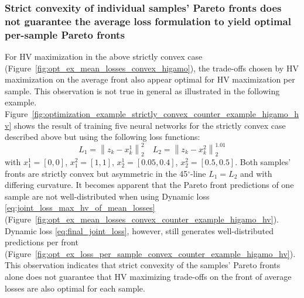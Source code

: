 \subsubsection{Strict convexity of individual samples' Pareto fronts does not guarantee the average loss formulation to yield optimal per-sample Pareto fronts}
\label{sec:counter example strict convexity}
For HV maximization in the above strictly convex case (Figure~\ref{fig:opt_ex_mean_losses_convex_higamo}), the trade-offs chosen by HV maximization on the average front also appear optimal for HV maximization per sample. This observation is not true in general as illustrated in the following example. Figure~\ref{fig:optimization_example_strictly_convex_counter_example_higamo_hv} shows the result of training five neural networks for the strictly convex case described above but using the following loss functions:
\begin{equation*}
    L_{1} = \left\lVert z_{k} - x_{k}^{1} \right\rVert_{2}^{2}  \quad L_{2} = \left\lVert z_{k} - x_{k}^{2}\right\rVert_{2}^{1.01}
\end{equation*}
with $x_{1}^{1} = [0,0]$, $x_{1}^{2} = [1,1]$, $x_{2}^{1} = [0.05,0.4]$, $x_{2}^{2} = [0.5,0.5]$. Both samples' fronts are strictly convex but asymmetric in the 45$^{\circ}$-line $L_{1}=L_{2}$ and with differing curvature.
It becomes apparent that the Pareto front predictions of one sample are not well-distributed when using Dynamic loss \eqref{eq:joint_loss_max_hv_of_mean_losses} (Figure~\ref{fig:opt_ex_mean_losses_convex_counter_example_higamo_hv}). Dynamic loss \eqref{eq:final_joint_loss}, however, still generates well-distributed predictions per front (Figure~\ref{fig:opt_ex_loss_per_sample_convex_counter_example_higamo_hv}). This observation indicates that strict convexity of the samples' Pareto fronts alone does not guarantee that HV maximizing trade-offs on the front of average losses are also optimal for each sample. %
